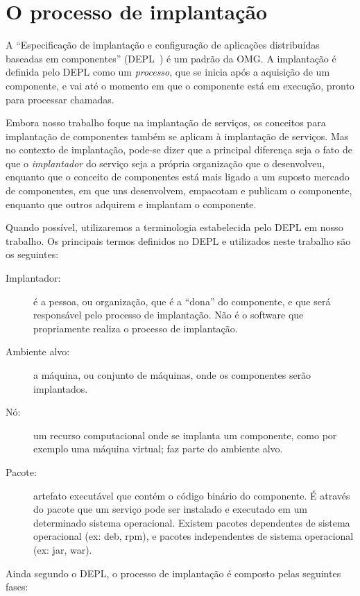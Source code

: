 \chapter{O processo de implantação}
\label{cap:implantacao}

A ``Especificação de implantação e configuração de aplicações distribuídas baseadas em componentes'' (DEPL~\cite{DEPL2006}) é um padrão da OMG. 
A implantação é definida pelo DEPL como um \emph{processo}, que se inicia após a aquisição de um componente, e vai até o momento em que o componente está em execução, pronto para processar chamadas. 

Embora nosso trabalho foque na implantação de serviços, os conceitos para implantação de componentes também se aplicam à implantação de serviços. 
Mas no contexto de implantação, pode-se dizer que a principal diferença seja o fato de que o \emph{implantador} do serviço seja a própria organização que o desenvolveu, enquanto que o conceito de componentes está mais ligado a um suposto mercado de componentes, em que uns desenvolvem, empacotam e publicam o componente, enquanto que outros adquirem e implantam o componente.

Quando possível, utilizaremos a terminologia estabelecida pelo DEPL em nosso trabalho.
Os principais termos definidos no DEPL e utilizados neste trabalho são os seguintes:

\begin{description}
\item [Implantador:] é a pessoa, ou organização, que é a ``dona'' do componente, e que será responsável pelo processo de implantação. Não é o software que propriamente realiza o processo de implantação.
\item [Ambiente alvo:] a máquina, ou conjunto de máquinas, onde os componentes serão implantados.
\item [Nó:] um recurso computacional onde se implanta um componente, 
como por exemplo uma máquina virtual; faz parte do ambiente alvo.
\item [Pacote:] artefato executável que contém o código binário do componente.
É através do pacote que um serviço pode ser instalado e executado em um determinado
sistema operacional. Existem pacotes dependentes de sistema operacional (ex: deb, rpm),
e pacotes independentes de sistema operacional (ex: jar, war).
\end{description}

Ainda segundo o DEPL, o processo de implantação é composto pelas seguintes fases:

